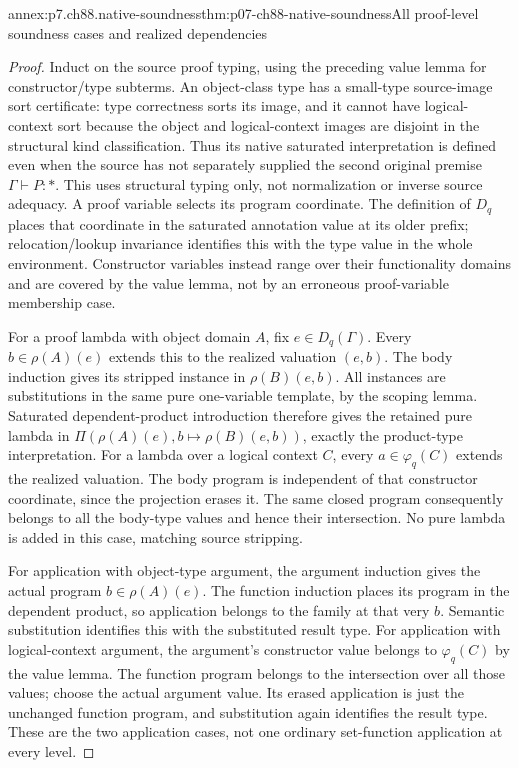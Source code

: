 \begin{annexitem}{annex:p7.ch88.native-soundness}{thm:p07-ch88-native-soundness}{All proof-level soundness cases and realized dependencies}
\begin{proof}
Induct on the source proof typing, using the preceding value lemma for
constructor/type subterms. An object-class type has a small-type source-image
sort certificate: type correctness sorts its image, and it cannot have
logical-context sort because the object and logical-context images are
disjoint in the structural kind classification. Thus its native saturated
interpretation is defined even when the source has not separately supplied
the second original premise \(\Gamma\vdash P:\ast\). This uses structural
typing only, not normalization or inverse source adequacy.
A proof variable selects its program coordinate.
The definition of \(D_q\) places that coordinate in the saturated
annotation value at its older prefix; relocation/lookup invariance identifies
this with the type value in the whole environment. Constructor variables
instead range over their functionality domains and are covered by the
value lemma, not by an erroneous proof-variable membership case.

For a proof lambda with object domain \(A\), fix \(e\in D_q(\Gamma)\).
Every \(b\in\rho(A)(e)\) extends this to the realized valuation
\((e,b)\). The body induction gives its stripped instance in
\(\rho(B)(e,b)\). All instances are substitutions in the same pure
one-variable template, by the scoping lemma. Saturated dependent-product
introduction therefore gives the retained pure lambda in
\(\Pi(\rho(A)(e),b\mapsto\rho(B)(e,b))\), exactly the product-type
interpretation. For a lambda over a logical context \(C\), every
\(a\in\varphi_q(C)\) extends the realized valuation. The body program
is independent of that constructor coordinate, since the projection
erases it. The same closed program consequently belongs to all the
body-type values and hence their intersection. No pure lambda is added
in this case, matching source stripping.

For application with object-type argument, the argument induction gives
the actual program \(b\in\rho(A)(e)\). The function induction places
its program in the dependent product, so application belongs to the
family at that very \(b\). Semantic substitution identifies this with
the substituted result type. For application with logical-context argument,
the argument's constructor value belongs to \(\varphi_q(C)\) by the
value lemma. The function program belongs to the intersection over all
those values; choose the actual argument value. Its erased application
is just the unchanged function program, and substitution again identifies
the result type. These are the two application cases, not one ordinary
set-function application at every level.


\end{proof}
\end{annexitem}
